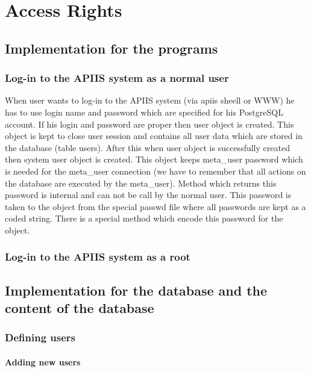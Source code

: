 \chapter{Access Rights}
\section{Implementation for the programs }
\subsection{Log-in to the APIIS system as a normal user}
When user wants to log-in to the APIIS system (via apiis sheell or WWW) he has to use login name and password which are specified for his PostgreSQL account. If his login and password are proper then user object is created. This object is kept to close user session  and contains all user data which are stored in the database (table users). After this when user object is successfully created then system user object is created. This object keeps meta\_user password which is needed for the meta\_user connection (we have to remember that all actions on the database are executed by the meta\_user). Method which returns this password is internal and can not be call by the normal user. This password is taken to the object from the special passwd file where all passwords are kept as a coded string. There is a special method  which encode this password for the object.  

\subsection{Log-in to the APIIS system as a root}

\section{Implementation for the database and the content of the database}

\subsection{Defining users}

\subsubsection{Adding new users}

